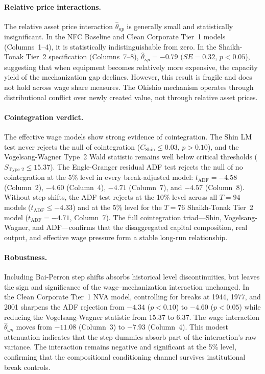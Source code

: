 \paragraph{Relative price interactions.}
The relative asset price interaction $\hat{\theta}_{\kappa p}$ is generally small and statistically insignificant. In the NFC Baseline and Clean Corporate Tier~1 models (Columns~1--4), it is statistically indistinguishable from zero. In the Shaikh-Tonak Tier~2 specification (Columns~7--8), $\hat{\theta}_{\kappa p} = -0.79$ ($SE = 0.32$, $p < 0.05$), suggesting that when equipment becomes relatively more expensive, the capacity yield of the mechanization gap declines. However, this result is fragile and does not hold across wage share measures. The Okishio mechanism operates through distributional conflict over newly created value, not through relative asset prices.

\paragraph{Cointegration verdict.}
The effective wage models show strong evidence of cointegration. The Shin LM test never rejects the null of cointegration ($C_{\text{Shin}} \le 0.03$, $p > 0.10$), and the Vogelsang-Wagner Type~2 Wald statistic remains well below critical thresholds ($S_{\text{Type~2}} \le 15.37$). The Engle-Granger residual ADF test rejects the null of no cointegration at the 5\% level in every break-adjusted model: $t_{\text{ADF}} = -4.58$ (Column~2), $-4.60$ (Column~4), $-4.71$ (Column~7), and $-4.57$ (Column~8). Without step shifts, the ADF test rejects at the 10\% level across all $T = 94$ models ($t_{\text{ADF}} \le -4.33$) and at the 5\% level for the $T = 76$ Shaikh-Tonak Tier~2 model ($t_{\text{ADF}} = -4.71$, Column~7). The full cointegration triad---Shin, Vogelsang-Wagner, and ADF---confirms that the disaggregated capital composition, real output, and effective wage pressure form a stable long-run relationship.

\paragraph{Robustness.}
Including Bai-Perron step shifts absorbs historical level discontinuities, but leaves the sign and significance of the wage--mechanization interaction unchanged. In the Clean Corporate Tier~1 NVA model, controlling for breaks at 1944, 1977, and 2001 sharpens the ADF rejection from $-4.34$ ($p < 0.10$) to $-4.60$ ($p < 0.05$) while reducing the Vogelsang-Wagner statistic from $15.37$ to $6.37$. The wage interaction $\hat{\theta}_{\omega\kappa}$ moves from $-11.08$ (Column~3) to $-7.93$ (Column~4). This modest attenuation indicates that the step dummies absorb part of the interaction's raw variance. The interaction remains negative and significant at the 5\% level, confirming that the compositional conditioning channel survives institutional break controls.


